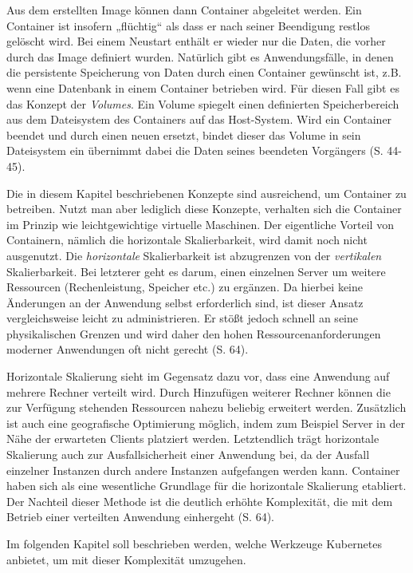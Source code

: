 \documentclass[11pt,a4paper]{article}
\begin{document}
Aus dem erstellten Image können dann Container abgeleitet werden. Ein Container ist insofern „flüchtig“ als dass er nach seiner
Beendigung restlos gelöscht wird. Bei einem Neustart enthält er wieder nur die Daten, die vorher durch das Image definiert wurden.
Natürlich gibt es Anwendungsfälle, in denen die persistente Speicherung von Daten durch einen Container gewünscht ist, z.B. wenn
eine Datenbank in einem Container betrieben wird. Für diesen Fall gibt es das Konzept der \emph{Volumes}.
Ein Volume spiegelt einen definierten Speicherbereich aus dem Dateisystem des Containers auf das Host-System.
Wird ein Container beendet und durch einen neuen ersetzt, bindet dieser das Volume in sein Dateisystem ein übernimmt
dabei die Daten seines beendeten Vorgängers \cite{kofler2021docker} (S. 44-45).

Die in diesem Kapitel beschriebenen Konzepte sind ausreichend, um Container zu betreiben.
Nutzt man aber lediglich diese Konzepte, verhalten sich die Container im Prinzip wie leichtgewichtige virtuelle Maschinen.
Der eigentliche Vorteil von Containern, nämlich die horizontale Skalierbarkeit, wird damit noch nicht ausgenutzt.
Die \emph{horizontale} Skalierbarkeit ist abzugrenzen von der \emph{vertikalen} Skalierbarkeit.
Bei letzterer geht es darum, einen einzelnen Server um weitere Ressourcen (Rechenleistung, Speicher etc.) zu ergänzen.
Da hierbei keine Änderungen an der Anwendung selbst erforderlich sind, ist dieser Ansatz vergleichsweise leicht
zu administrieren. Er stößt jedoch schnell an seine physikalischen Grenzen und wird daher den hohen
Ressourcenanforderungen moderner Anwendungen oft nicht gerecht \cite{Schmeling_Dargatz_2022} (S. 64).

Horizontale Skalierung sieht im Gegensatz dazu vor, dass eine Anwendung
auf mehrere Rechner verteilt wird. Durch Hinzufügen weiterer Rechner können die zur Verfügung stehenden Ressourcen nahezu beliebig erweitert werden.
Zusätzlich ist auch eine geografische Optimierung möglich, indem zum Beispiel Server in der Nähe der erwarteten Clients platziert werden.
Letztendlich trägt horizontale Skalierung auch zur Ausfallsicherheit einer Anwendung bei, da der Ausfall einzelner Instanzen durch andere Instanzen
aufgefangen werden kann.
Container haben sich als eine wesentliche Grundlage für die horizontale Skalierung etabliert.
Der Nachteil dieser Methode ist die deutlich erhöhte Komplexität,
die mit dem Betrieb einer verteilten Anwendung einhergeht \cite{Schmeling_Dargatz_2022} (S. 64).

Im folgenden Kapitel soll beschrieben werden, welche Werkzeuge Kubernetes anbietet, um mit dieser Komplexität umzugehen.
\end{document}
